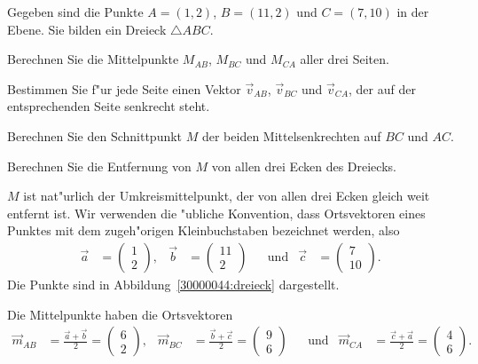 Gegeben sind die Punkte $A=(1,2)$, $B=(11,2)$ und $C=(7,10)$
in der Ebene.
Sie bilden ein Dreieck $\triangle ABC$.
\begin{teilaufgaben}
\item Berechnen Sie die Mittelpunkte $M_{AB}$, $M_{BC}$ und $M_{CA}$ aller drei
Seiten.
\item Bestimmen Sie f"ur jede Seite einen Vektor $\vec{v}_{AB}$, $\vec{v}_{BC}$
und $\vec{v}_{CA}$, der auf der entsprechenden Seite senkrecht steht.
\item Berechnen Sie den Schnittpunkt $M$ der beiden Mittelsenkrechten auf
$BC$ und $AC$.
\item Berechnen Sie die Entfernung von $M$ von allen drei Ecken des Dreiecks.
\end{teilaufgaben}

\begin{loesung}
$M$ ist nat"urlich der Umkreismittelpunkt, der von allen drei Ecken gleich
weit entfernt ist.
Wir verwenden die "ubliche Konvention, dass Ortsvektoren eines Punktes
mit dem zugeh"origen Kleinbuchstaben bezeichnet werden, also
\[
\begin{aligned}
\vec{a}&=\begin{pmatrix} 1\\ 2\end{pmatrix},&
\vec{b}&=\begin{pmatrix}11\\ 2\end{pmatrix}&
&\text{und}&
\vec{c}&=\begin{pmatrix} 7\\10\end{pmatrix}.
\end{aligned}
\]
Die Punkte sind in Abbildung~\ref{30000044:dreieck} dargestellt.
\begin{teilaufgaben}
%
%
\item Die Mittelpunkte haben die Ortsvektoren
\[
\begin{aligned}
\vec{m}_{AB}&=\frac{\vec{a}+\vec{b}}2=\begin{pmatrix}6\\2\end{pmatrix},
&
\vec{m}_{BC}&=\frac{\vec{b}+\vec{c}}2=\begin{pmatrix}9\\6\end{pmatrix}
&
&\text{und}&
\vec{m}_{CA}&=\frac{\vec{c}+\vec{a}}2=\begin{pmatrix}4\\6\end{pmatrix}.

\end{aligned}\]
\end{teilaufgaben}
\end{loesung}
